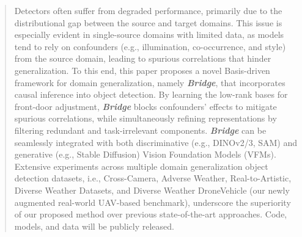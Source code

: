 \begin{abstract}
Detectors often suffer from degraded performance, primarily due to the distributional gap between the source and target domains. 
This issue is especially evident in single-source domains with limited data, as models tend to rely on confounders (e.g., illumination, co-occurrence, and style) from the source domain, leading to spurious correlations that hinder generalization. 
To this end, this paper proposes a novel Basis-driven framework for domain generalization, namely \textbf{\textit{Bridge}}, that incorporates causal inference into object detection. 
By learning the low-rank bases for front-door adjustment, \textbf{\textit{Bridge}} blocks confounders' effects to mitigate spurious correlations, while simultaneously refining representations by filtering redundant and task-irrelevant components.
\textbf{\textit{Bridge}} can be seamlessly integrated with both discriminative (e.g., DINOv2/3, SAM) and generative (e.g., Stable Diffusion) Vision Foundation Models (VFMs).
Extensive experiments across multiple domain generalization object detection datasets, i.e., Cross-Camera, Adverse Weather, Real-to-Artistic, Diverse Weather Datasets, and Diverse Weather DroneVehicle (our newly augmented real-world UAV-based benchmark), underscore the superiority of our proposed method over previous state-of-the-art approaches.
Code, models, and data will be publicly released. 

\end{abstract}